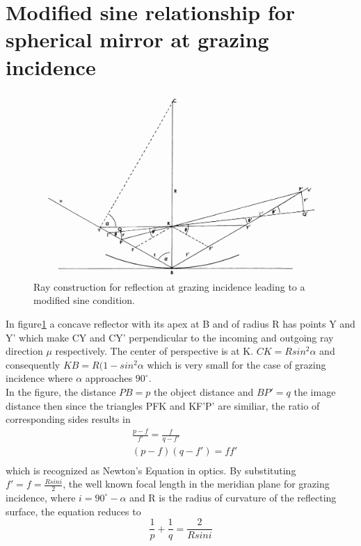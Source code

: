 \documentclass[../main.tex]{subfiles}
\begin{document}
	\section{Modified sine relationship for spherical mirror at grazing incidence}
	\begin{figure}[h!]
	  \centering
	  \includegraphics[scale=0.4]{../graphics/Abbe_sine_condition2.png}
	  \caption{Ray construction for reflection at grazing incidence leading to a modified sine condition.}
	  \label{fig:modified abbe}
	\end{figure}
	In figure\ref{fig:modified abbe} a concave reflector with its apex at B and of radius R has points Y and Y' which make CY and CY' perpendicular to the incoming and outgoing ray direction $\mu$ respectively. The center of perspective is at K. $CK=Rsin^2\alpha$ and consequently $KB=R(1-sin^2\alpha$ which is very small for the case of grazing incidence where $\alpha$ approaches $90^{\circ}$.\\
	In the figure, the distance $PB=p$ the object distance and $BP'=q$ the image distance then since the triangles PFK and KF'P' are similiar, the ratio of corresponding sides results in
	\begin{align}
	&\frac{p-f}{f'}=\frac{f}{q-f'}\\
	&(p-f)(q-f')=ff'\label{eq1}\\
	\end{align}
	which is recognized as Newton's Equation in optics. By substituting $f'=f=\frac{Rsini}{2}$, the well known focal length in the meridian plane for grazing incidence, where $i=90^{\circ}-\alpha$ and R is the radius of curvature of the reflecting surface, the equation reduces to
	\begin{equation}
	\frac{1}{p}+\frac{1}{q}=\frac{2}{Rsini}
	\end{equation}
\end{document}
